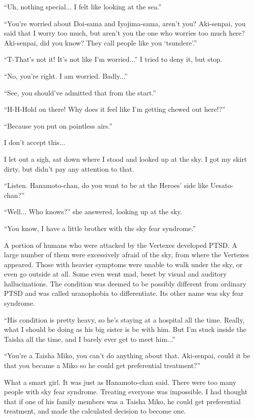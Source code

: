 ``Uh, nothing special... I felt like looking at the sea.''

``You're worried about Doi-sama and Iyojima-sama, aren't you? Aki-senpai, you said that I worry too much, but aren't you the one who worries too much here? Aki-senpai, did you know? They call people like you `tsundere'.''

``T-That's not it! It's not like I'm worried...'' I tried to deny it, but stop.

``No, you're right. I am worried. Badly...''

``See, you should've admitted that from the start.''

``H-H-Hold on there! Why does it feel like I'm getting chewed out here!?''

``Because you put on pointless airs.''

I don't accept this...

I let out a sigh, sat down where I stood and looked up at the sky. I got my skirt dirty, but didn't pay any attention to that.

``Listen. Hanamoto-chan, do you want to be at the Heroes' side like Uesato-chan?''

``Well... Who knows?'' she answered, looking up at the sky.

``You know, I have a little brother with the sky fear syndrome.''

A portion of humans who were attacked by the Vertexes developed PTSD. A large number of them were excessively afraid of the sky, from where the Vertexes appeared. Those with heavier symptoms were unable to walk under the sky, or even go outside at all. Some even went mad, beset by visual and auditory hallucinations. The condition was deemed to be possibly different from ordinary PTSD and was called uranophobia to differentiate. Its other name was sky fear syndrome.

``His condition is pretty heavy, so he's staying at a hospital all the time. Really, what I should be doing as his big sister is be with him. But I'm stuck inside the Taisha all the time, and I barely ever get to meet him...''

``You're a Taisha Miko, you can't do anything about that. Aki-senpai, could it be that you became a Miko so he could get preferential treatment?''

What a smart girl. It was just as Hanamoto-chan said. There were too many people with sky fear syndrome. Treating everyone was impossible. I had thought that if one of his family members was a Taisha Miko, he could get preferential treatment, and made the calculated decision to become one.


